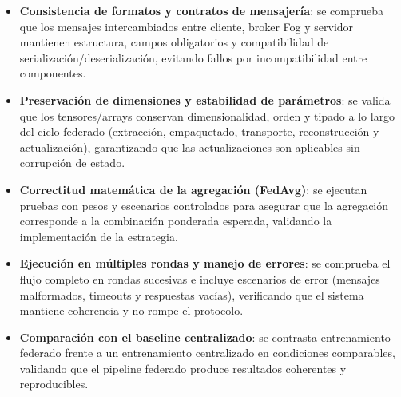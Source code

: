 \documentclass{report}
\begin{document}
\begin{itemize}
    \item \textbf{Consistencia de formatos y contratos de mensajería}: se comprueba que los mensajes intercambiados entre cliente, broker Fog y servidor mantienen estructura, campos obligatorios y compatibilidad de serialización/deserialización, evitando fallos por incompatibilidad entre componentes.
    \item \textbf{Preservación de dimensiones y estabilidad de parámetros}: se valida que los tensores/arrays conservan dimensionalidad, orden y tipado a lo largo del ciclo federado (extracción, empaquetado, transporte, reconstrucción y actualización), garantizando que las actualizaciones son aplicables sin corrupción de estado.
    \item \textbf{Correctitud matemática de la agregación (FedAvg)}: se ejecutan pruebas con pesos y escenarios controlados para asegurar que la agregación corresponde a la combinación ponderada esperada, validando la implementación de la estrategia.
    \item \textbf{Ejecución en múltiples rondas y manejo de errores}: se comprueba el flujo completo en rondas sucesivas e incluye escenarios de error (mensajes malformados, timeouts y respuestas vacías), verificando que el sistema mantiene coherencia y no rompe el protocolo.
    \item \textbf{Comparación con el baseline centralizado}: se contrasta entrenamiento federado frente a un entrenamiento centralizado en condiciones comparables, validando que el pipeline federado produce resultados coherentes y reproducibles.
\end{itemize}
\end{document}
